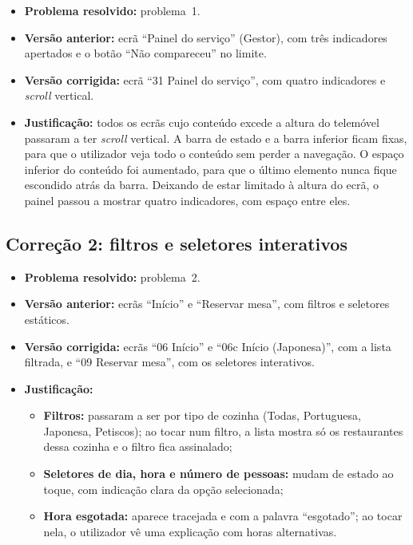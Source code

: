 \begin{itemize}
  \item \textbf{Problema resolvido:} problema~1.
  \item \textbf{Versão anterior:} ecrã ``Painel do serviço'' (Gestor), com três indicadores
        apertados e o botão ``Não compareceu'' no limite.
  \item \textbf{Versão corrigida:} ecrã ``31 \textperiodcentered{} Painel do serviço'', com
        quatro indicadores e \textit{scroll} vertical.
  \item \textbf{Justificação:} todos os ecrãs cujo conteúdo excede a altura do telemóvel
        passaram a ter \textit{scroll} vertical. A barra de estado e a barra inferior ficam
        fixas, para que o utilizador veja todo o conteúdo sem perder a navegação. O espaço
        inferior do conteúdo foi aumentado, para que o último elemento nunca fique escondido
        atrás da barra. Deixando de estar limitado à altura do ecrã, o painel passou a mostrar
        quatro indicadores, com espaço entre eles.
\end{itemize}


\subsection{Correção 2: filtros e seletores interativos}

\begin{itemize}
  \item \textbf{Problema resolvido:} problema~2.
  \item \textbf{Versão anterior:} ecrãs ``Início'' e ``Reservar mesa'', com filtros e seletores
        estáticos.
  \item \textbf{Versão corrigida:} ecrãs ``06 \textperiodcentered{} Início'' e
        ``06c \textperiodcentered{} Início (Japonesa)'', com a lista filtrada, e
        ``09 \textperiodcentered{} Reservar mesa'', com os seletores interativos.
  \item \textbf{Justificação:}
    \begin{itemize}
      \item \textbf{Filtros:} passaram a ser por tipo de cozinha (Todas, Portuguesa, Japonesa,
            Petiscos); ao tocar num filtro, a lista mostra só os restaurantes dessa cozinha e o
            filtro fica assinalado;
      \item \textbf{Seletores de dia, hora e número de pessoas:} mudam de estado ao toque, com
            indicação clara da opção selecionada;
      \item \textbf{Hora esgotada:} aparece tracejada e com a palavra ``esgotado''; ao tocar
            nela, o utilizador vê uma explicação com horas alternativas.
    \end{itemize}
\end{itemize}

